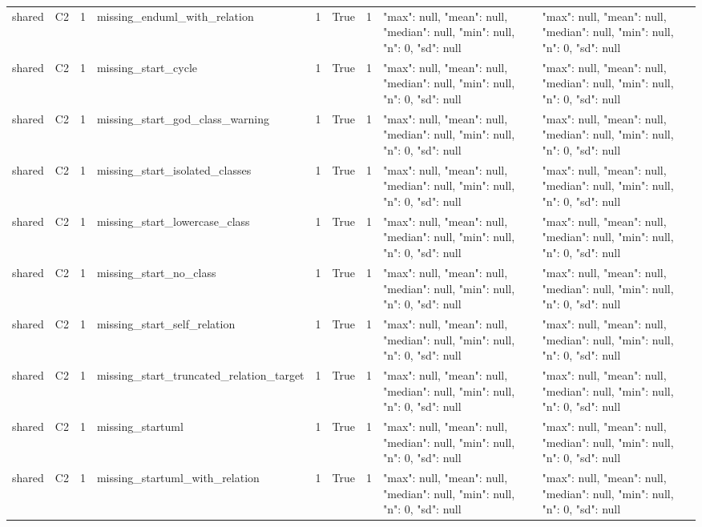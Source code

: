 \begin{tabular}{lllllllll}
shared & C2 & 1 & missing\_enduml\_with\_relation & 1 & True & 1 & {"max": null, "mean": null, "median": null, "min": null, "n": 0, "sd": null} & {"max": null, "mean": null, "median": null, "min": null, "n": 0, "sd": null} \\
shared & C2 & 1 & missing\_start\_cycle & 1 & True & 1 & {"max": null, "mean": null, "median": null, "min": null, "n": 0, "sd": null} & {"max": null, "mean": null, "median": null, "min": null, "n": 0, "sd": null} \\
shared & C2 & 1 & missing\_start\_god\_class\_warning & 1 & True & 1 & {"max": null, "mean": null, "median": null, "min": null, "n": 0, "sd": null} & {"max": null, "mean": null, "median": null, "min": null, "n": 0, "sd": null} \\
shared & C2 & 1 & missing\_start\_isolated\_classes & 1 & True & 1 & {"max": null, "mean": null, "median": null, "min": null, "n": 0, "sd": null} & {"max": null, "mean": null, "median": null, "min": null, "n": 0, "sd": null} \\
shared & C2 & 1 & missing\_start\_lowercase\_class & 1 & True & 1 & {"max": null, "mean": null, "median": null, "min": null, "n": 0, "sd": null} & {"max": null, "mean": null, "median": null, "min": null, "n": 0, "sd": null} \\
shared & C2 & 1 & missing\_start\_no\_class & 1 & True & 1 & {"max": null, "mean": null, "median": null, "min": null, "n": 0, "sd": null} & {"max": null, "mean": null, "median": null, "min": null, "n": 0, "sd": null} \\
shared & C2 & 1 & missing\_start\_self\_relation & 1 & True & 1 & {"max": null, "mean": null, "median": null, "min": null, "n": 0, "sd": null} & {"max": null, "mean": null, "median": null, "min": null, "n": 0, "sd": null} \\
shared & C2 & 1 & missing\_start\_truncated\_relation\_target & 1 & True & 1 & {"max": null, "mean": null, "median": null, "min": null, "n": 0, "sd": null} & {"max": null, "mean": null, "median": null, "min": null, "n": 0, "sd": null} \\
shared & C2 & 1 & missing\_startuml & 1 & True & 1 & {"max": null, "mean": null, "median": null, "min": null, "n": 0, "sd": null} & {"max": null, "mean": null, "median": null, "min": null, "n": 0, "sd": null} \\
shared & C2 & 1 & missing\_startuml\_with\_relation & 1 & True & 1 & {"max": null, "mean": null, "median": null, "min": null, "n": 0, "sd": null} & {"max": null, "mean": null, "median": null, "min": null, "n": 0, "sd": null} \\

\end{tabular}
